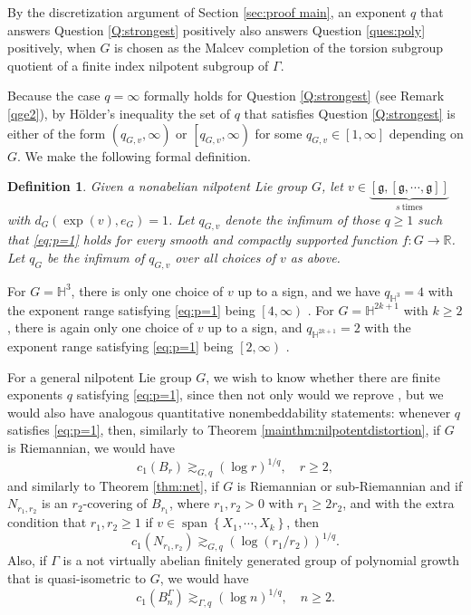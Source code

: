 \documentclass[11pt,reqno]{amsart}
\newtheorem{definition}[theorem]{Definition}
\newcommand{\1}{\mathbf 1}
\begin{document}
By the discretization argument of Section \ref{sec:proof main}, an exponent $q$ that answers Question \ref{Q:strongest} positively also answers Question \ref{ques:poly} positively, when $G$ is chosen as the Malcev completion of the torsion subgroup quotient of a finite index nilpotent subgroup of $\Gamma$.

Because the case $q=\infty$ formally holds for Question \ref{Q:strongest} (see Remark \ref{qge2}), by H\"older's inequality the set of $q$ that satisfies Question \ref{Q:strongest} is either of the form $\left(q_{G,v},\infty\right)$ or $\left[q_{G,v},\infty\right)$ for some $q_{G,v}\in \left[1,\infty\right]$ depending on $G$. We make the following formal definition.
\begin{definition}
    Given a nonabelian nilpotent Lie group $G$, let $v\in \underbrace{\left[\mathfrak{g},\left[\mathfrak{g},\cdots,\mathfrak{g}\right]\right]}_{s~\mathrm{times}}$with $d_G\left(\exp\left(v\right),e_G\right)=1$. Let $q_{G,v}$ denote the infimum of those $q\ge 1$ such that \eqref{eq:p=1} holds for every smooth and compactly supported function $f:G\to \mathbb{R}$. Let $q_G$ be the infimum of $q_{G,v}$ over all choices of $v$ as above.
\end{definition}
For $G=\mathbb{H}^3$, there is only one choice of $v$ up to a sign, and we have $q_{\mathbb{H}^3}=4$ with the exponent range satisfying \eqref{eq:p=1} being $\left[4,\infty\right)$ \cite{naor2022foliated}. For  $G=\mathbb{H}^{2k+1}$ with $k\ge 2$, there is again only one choice of $v$ up to a sign, and $q_{\mathbb{H}^{2k+1}}=2$  with the exponent range satisfying \eqref{eq:p=1} being $\left[2,\infty\right)$ \cite{naor2018vertical}.

For a general nilpotent Lie group $G$, we wish to know whether there are finite exponents $q$ satisfying \eqref{eq:p=1}, since then not only would we reprove \cite{eriksson2023nilpotent}, but we would also have analogous quantitative nonembeddability statements: whenever $q$ satisfies \eqref{eq:p=1}, then, similarly to Theorem \ref{mainthm:nilpotentdistortion}, if $G$ is Riemannian, we would have
\[
c_1\left(B_r\right)\gtrsim_{G,q} (\log r)^{1/q},\quad r\ge 2,
\]
and similarly to Theorem \ref{thm:net}, if $G$ is Riemannian or sub-Riemannian and if $N_{r_1,r_2}$ is an $r_2$-covering of $B_{r_1}$, where $r_1,r_2>0$ with $r_1\ge 2r_2$, and with the extra condition that $r_1,r_2\ge 1$ if $v\in \operatorname{span}\left\{X_1,\cdots,X_k\right\}$, then
\[
c_1\left(N_{r_1,r_2}\right)\gtrsim_{G,q} \left(\log \left(r_1/r_2\right)\right)^{1/q}.
\]
Also, if $\Gamma$ is a not virtually abelian finitely generated group of polynomial growth that is quasi-isometric to $G$, we would have
\[
c_1\left(B_n^\Gamma\right)\gtrsim_{\Gamma,q} \left(\log n\right)^{1/q},\quad n\ge 2.
\]
\end{document}
